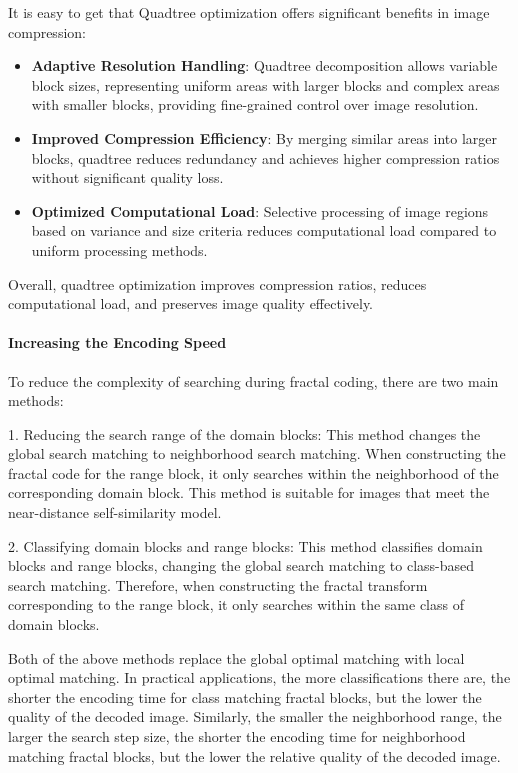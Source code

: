 \documentclass[a4paper,11pt, titlepage]{article}
\theoremstyle{definition}
\theoremstyle{plain}
\theoremstyle{remark}
\theoremstyle{definition}
\begin{document}
It is easy to get that Quadtree optimization offers significant benefits in image compression:

\begin{itemize}
    \item \textbf{Adaptive Resolution Handling}: Quadtree decomposition allows variable block sizes, representing uniform areas with larger blocks and complex areas with smaller blocks, providing fine-grained control over image resolution.
    \item \textbf{Improved Compression Efficiency}: By merging similar areas into larger blocks, quadtree reduces redundancy and achieves higher compression ratios without significant quality loss.
    \item \textbf{Optimized Computational Load}: Selective processing of image regions based on variance and size criteria reduces computational load compared to uniform processing methods.
\end{itemize}

Overall, quadtree optimization improves compression ratios, reduces computational load, and preserves image quality effectively.

\paragraph{Increasing the Encoding Speed}

To reduce the complexity of searching during fractal coding, there are two main methods:

1. Reducing the search range of the domain blocks: This method changes the global search matching to neighborhood search matching. When constructing the fractal code for the range block, it only searches within the neighborhood of the corresponding domain block. This method is suitable for images that meet the near-distance self-similarity model.

2. Classifying domain blocks and range blocks: This method classifies domain blocks and range blocks, changing the global search matching to class-based search matching. Therefore, when constructing the fractal transform corresponding to the range block, it only searches within the same class of domain blocks.

Both of the above methods replace the global optimal matching with local optimal matching. In practical applications, the more classifications there are, the shorter the encoding time for class matching fractal blocks, but the lower the quality of the decoded image. Similarly, the smaller the neighborhood range, the larger the search step size, the shorter the encoding time for neighborhood matching fractal blocks, but the lower the relative quality of the decoded image.
\end{document}
